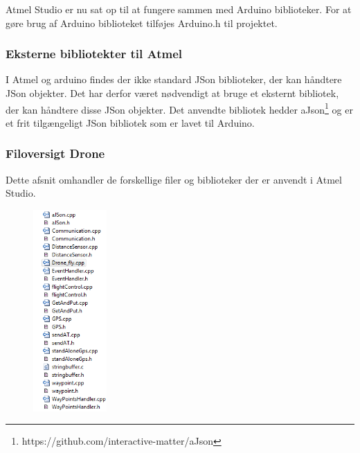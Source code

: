 Atmel Studio er nu sat op til at fungere sammen med Arduino biblioteker. For at gøre brug af Arduino biblioteket tilføjes Arduino.h til projektet.

\subsubsection*{Eksterne bibliotekter til Atmel}

I Atmel og arduino findes der ikke standard JSon biblioteker, der kan håndtere JSon objekter. Det har derfor været nødvendigt at bruge et eksternt bibliotek, der kan håndtere disse JSon objekter.
Det anvendte bibliotek hedder aJson\footnote{https://github.com/interactive-matter/aJson} og er et frit tilgængeligt JSon bibliotek som er lavet til Arduino.


\subsubsection*{Filoversigt Drone}

Dette afsnit omhandler de forskellige filer og biblioteker der er anvendt i Atmel Studio. 


\begin{figure}[H]
	\centering
	\includegraphics[width=0.25\textwidth]{Billeder/implementation/Howtoguide/atmel_filer.png}
\end{figure}

